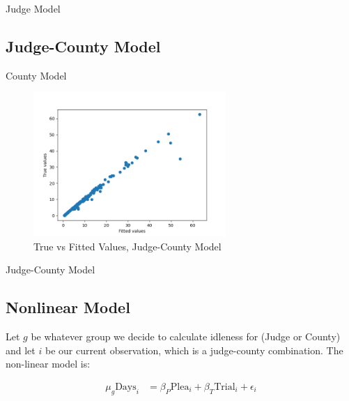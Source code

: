\documentclass[11pt, oneside]{article}   	%
\theoremstyle{ModifiedStyle}
\begin{document}
		    \begin{table}[H]
		      \centering
		      \caption{Judge Model}
		      
		    \end{table}

		  \subsection{Judge-County Model}

		    \begin{table}[H]
		      \centering
		      \caption{County Model}
		      
		    \end{table}

		    \begin{figure}[H]
		      \centering
		      \includegraphics[width=0.65\textwidth]{../../output/figures/Exploration/fit_min_JudgeIDCounty}
		      \caption{True vs Fitted Values, Judge-County Model}
		    \end{figure}

		    \begin{table}[H]
		      \centering
		      \caption{Judge-County Model}
		      
		    \end{table}

	\subsection{Nonlinear Model}
		Let $g$ be whatever group we decide to calculate idleness for (Judge or County) and let $i$ be our current observation, which is a judge-county combination. The non-linear model is:

		\begin{align*}
			\mu_g \text{Days}_i &= \beta_P \text{Plea}_i + \beta_T \text{Trial}_i + \epsilon_i
		\end{align*}
\end{document}

